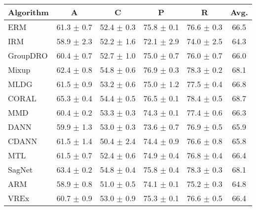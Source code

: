 \begin{table*}
\begin{center}
\begin{tabular}{lccccc}
\toprule
\textbf{Algorithm}   & \textbf{A}           & \textbf{C}           & \textbf{P}           & \textbf{R}           & \textbf{Avg.}         \\
\midrule
ERM                  & 61.3 $\pm$ 0.7       & 52.4 $\pm$ 0.3       & 75.8 $\pm$ 0.1       & 76.6 $\pm$ 0.3       & 66.5                 \\
IRM                  & 58.9 $\pm$ 2.3       & 52.2 $\pm$ 1.6       & 72.1 $\pm$ 2.9       & 74.0 $\pm$ 2.5       & 64.3                 \\
GroupDRO             & 60.4 $\pm$ 0.7       & 52.7 $\pm$ 1.0       & 75.0 $\pm$ 0.7       & 76.0 $\pm$ 0.7       & 66.0                 \\
Mixup                & 62.4 $\pm$ 0.8       & 54.8 $\pm$ 0.6       & 76.9 $\pm$ 0.3       & 78.3 $\pm$ 0.2       & 68.1                 \\
MLDG                 & 61.5 $\pm$ 0.9       & 53.2 $\pm$ 0.6       & 75.0 $\pm$ 1.2       & 77.5 $\pm$ 0.4       & 66.8                 \\
CORAL                & 65.3 $\pm$ 0.4       & 54.4 $\pm$ 0.5       & 76.5 $\pm$ 0.1       & 78.4 $\pm$ 0.5       & 68.7                 \\
MMD                  & 60.4 $\pm$ 0.2       & 53.3 $\pm$ 0.3       & 74.3 $\pm$ 0.1       & 77.4 $\pm$ 0.6       & 66.3                 \\
DANN                 & 59.9 $\pm$ 1.3       & 53.0 $\pm$ 0.3       & 73.6 $\pm$ 0.7       & 76.9 $\pm$ 0.5       & 65.9                 \\
CDANN                & 61.5 $\pm$ 1.4       & 50.4 $\pm$ 2.4       & 74.4 $\pm$ 0.9       & 76.6 $\pm$ 0.8       & 65.8                 \\
MTL                  & 61.5 $\pm$ 0.7       & 52.4 $\pm$ 0.6       & 74.9 $\pm$ 0.4       & 76.8 $\pm$ 0.4       & 66.4                 \\
SagNet               & 63.4 $\pm$ 0.2       & 54.8 $\pm$ 0.4       & 75.8 $\pm$ 0.4       & 78.3 $\pm$ 0.3       & 68.1                 \\
ARM                  & 58.9 $\pm$ 0.8       & 51.0 $\pm$ 0.5       & 74.1 $\pm$ 0.1       & 75.2 $\pm$ 0.3       & 64.8                 \\
VREx                 & 60.7 $\pm$ 0.9       & 53.0 $\pm$ 0.9       & 75.3 $\pm$ 0.1       & 76.6 $\pm$ 0.5       & 66.4                 \\

\end{tabular}
\end{center}
\end{table*}
